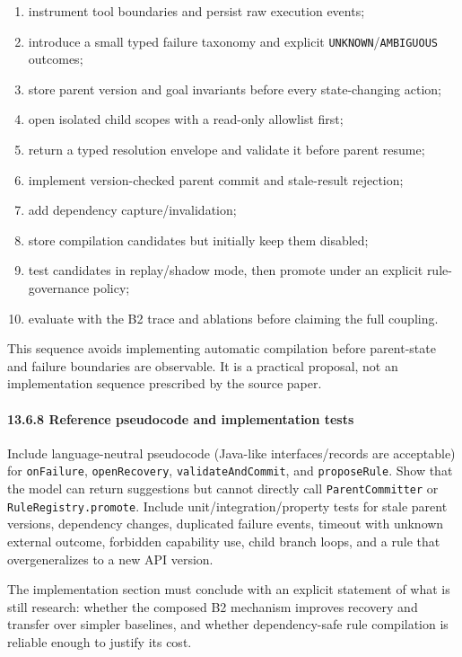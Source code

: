 \begin{enumerate}
\def\labelenumi{\arabic{enumi}.}
\tightlist
\item
  instrument tool boundaries and persist raw execution events;
\item
  introduce a small typed failure taxonomy and explicit \texttt{UNKNOWN}/\texttt{AMBIGUOUS} outcomes;
\item
  store parent version and goal invariants before every state-changing action;
\item
  open isolated child scopes with a read-only allowlist first;
\item
  return a typed resolution envelope and validate it before parent resume;
\item
  implement version-checked parent commit and stale-result rejection;
\item
  add dependency capture/invalidation;
\item
  store compilation candidates but initially keep them disabled;
\item
  test candidates in replay/shadow mode, then promote under an explicit rule-governance policy;
\item
  evaluate with the B2 trace and ablations before claiming the full coupling.
\end{enumerate}

This sequence avoids implementing automatic compilation before parent-state and failure boundaries are observable. It is a practical proposal, not an implementation sequence prescribed by the source paper.

\paragraph{13.6.8 Reference pseudocode and implementation tests}\label{1368-reference-pseudocode-and-implementation-tests}

Include language-neutral pseudocode (Java-like interfaces/records are acceptable) for \texttt{onFailure}, \texttt{openRecovery}, \texttt{validateAndCommit}, and \texttt{proposeRule}. Show that the model can return suggestions but cannot directly call \texttt{ParentCommitter} or \texttt{RuleRegistry.promote}. Include unit/integration/property tests for stale parent versions, dependency changes, duplicated failure events, timeout with unknown external outcome, forbidden capability use, child branch loops, and a rule that overgeneralizes to a new API version.

The implementation section must conclude with an explicit statement of what is still research: whether the composed B2 mechanism improves recovery and transfer over simpler baselines, and whether dependency-safe rule compilation is reliable enough to justify its cost.

